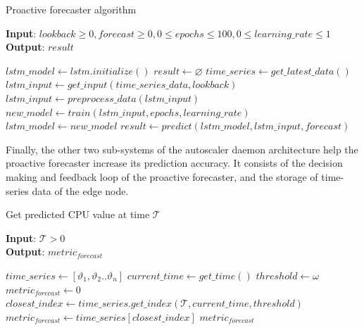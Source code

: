 \begin{algorithm}
    \caption{Proactive forecaster algorithm}
    \label{alg:proactive-forecast-alg}
    \textbf{Input}: $lookback \geq 0, forecast \geq 0, 0 \leq epochs \leq 100, 0 \leq learning\_rate \leq 1$\\
    \textbf{Output}: $result$
    \begin{algorithmic}
        \State $lstm\_model \gets lstm.initialize()$
        \State $result \gets \varnothing$
            \State $time\_series \gets get\_latest\_data()$
            \State $lstm\_input \gets get\_input(time\_series\_data, lookback)$
            \State $lstm\_input \gets preprocess\_data(lstm\_input)$
            \State $new\_model \gets train(lstm\_input, epochs, learning\_rate)$
                \State $lstm\_model \gets new\_model$
            \EndIf
            \State $result \gets predict(lstm\_model, lstm\_input, forecast)$
            \State {}
        \EndWhile
    \end{algorithmic}
\end{algorithm}

Finally, the other two sub-systems of the autoscaler daemon architecture help the proactive forecaster increase its prediction accuracy. It consists of the decision making and feedback loop of the proactive forecaster, and the storage of time-series data of the edge node.\par

\begin{algorithm}
    \caption{Get predicted CPU value at time $\mathcal{T}$}
    \label{alg:get-forecast-value}
    \textbf{Input}: $\mathcal{T} > 0$\\
    \textbf{Output}: $metric_{forecast}$
    \begin{algorithmic}
        \State $time\_series \gets [ \vartheta_1, \vartheta_2 .. \vartheta_n ]$
        \State $current\_time \gets get\_time()$
        \State $threshold \gets \omega$
        \State $metric_{forecast} \gets 0$
        \State $closest\_index \gets time\_series.get\_index(\mathcal{T}, current\_time, threshold)$
            \State $metric_{forecast} \gets time\_series[closest\_index]$
        \EndIf
        \State \Return $metric_{forecast}$
    \end{algorithmic}
\end{algorithm}

